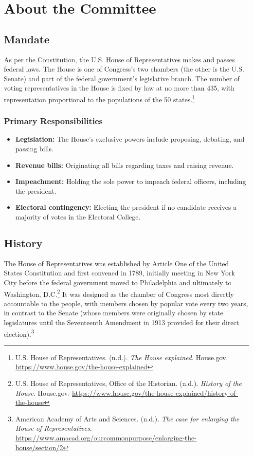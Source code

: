 \section{About the Committee}

\subsection{Mandate}

As per the Constitution, the U.S. House of Representatives makes and passes federal laws. The House is one of Congress’s two chambers (the other is the U.S. Senate) and part of the federal government’s legislative branch. The number of voting representatives in the House is fixed by law at no more than 435, with representation proportional to the populations of the 50 states.\footnote{U.S. House of Representatives. (n.d.). \emph{The House explained}. House.gov. \url{https://www.house.gov/the-house-explained}}

\subsubsection{Primary Responsibilities}

\begin{itemize}
  \item \textbf{Legislation:} The House’s exclusive powers include proposing, debating, and passing bills.
  \item \textbf{Revenue bills:} Originating all bills regarding taxes and raising revenue.
  \item \textbf{Impeachment:} Holding the sole power to impeach federal officers, including the president.
  \item \textbf{Electoral contingency:} Electing the president if no candidate receives a majority of votes in the Electoral College.
\end{itemize}

\subsection{History}

The House of Representatives was established by Article One of the United States Constitution and first convened in 1789, initially meeting in New York City before the federal government moved to Philadelphia and ultimately to Washington, D.C.\footnote{U.S. House of Representatives, Office of the Historian. (n.d.). \emph{History of the House}. House.gov. \url{https://www.house.gov/the-house-explained/history-of-the-house}} It was designed as the chamber of Congress most directly accountable to the people, with members chosen by popular vote every two years, in contrast to the Senate (whose members were originally chosen by state legislatures until the Seventeenth Amendment in 1913 provided for their direct election).\footnote{American Academy of Arts and Sciences. (n.d.). \emph{The case for enlarging the House of Representatives}. \url{https://www.amacad.org/ourcommonpurpose/enlarging-the-house/section/2}}

